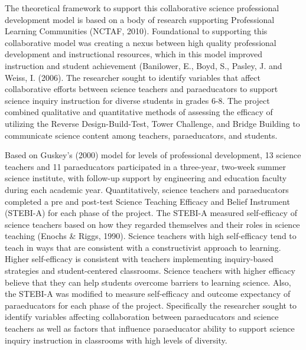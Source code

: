 \documentclass[11.5pt]{sig-alternate} %
\begin{document}
\begin{large}
The theoretical framework to support this collaborative science professional development model is based on a body of research supporting Professional Learning Communities (NCTAF, 2010). Foundational to supporting this collaborative model was creating a nexus between high quality professional development and instructional resources, which in this model improved instruction and   student achievement (Banilower, E., Boyd, S., Pasley, J. and Weiss, I. (2006).  The researcher sought to identify variables that affect collaborative efforts between science teachers and paraeducators to support science inquiry instruction for diverse students in grades 6-8. The project combined qualitative and quantitative methods of assessing the efficacy of utilizing the Reverse Design-Build-Test, Tower Challenge, and Bridge Building to communicate science content among teachers, paraeducators, and students. 

Based on Guskey’s (2000) model for levels of professional development, 13 science teachers and 11 paraeducators participated in a three-year, two-week summer science institute, with follow-up support by engineering and education faculty during each academic year.  Quantitatively, science teachers and paraeducators completed a pre and post-test Science Teaching Efficacy and Belief Instrument (STEBI-A) for each phase of the project. The STEBI-A measured self-efficacy of science teachers based on how they regarded themselves and their roles in science teaching (Enochs \& Riggs, 1990). Science teachers with high self-efficacy tend to teach in ways that are consistent with a constructivist approach to learning. Higher self-efficacy is consistent with teachers implementing inquiry-based strategies and student-centered classrooms. Science teachers with higher efficacy believe that they can help students overcome barriers to learning science. Also, the STEBI-A was modified to measure self-efficacy and outcome expectancy of paraeducators for each phase of the project. Specifically the researcher sought to identify variables affecting collaboration between paraeducators and science teachers as well as factors that influence paraeducator ability to support science inquiry instruction in classrooms with high levels of diversity.


\end{large}
\end{document}
